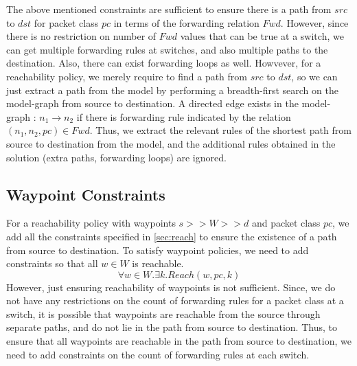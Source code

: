 The above mentioned constraints are sufficient to ensure there is a path from $src$ to $dst$ for packet class $pc$ in terms of the forwarding relation $Fwd$. However, since there is no restriction on number of $Fwd$ values that can be true at a switch, we can get multiple forwarding rules at switches, and also multiple paths to the destination. Also, there can exist forwarding loops as well. Howvever, for a reachability policy, we merely require to find a path from $src$ to $dst$, so we can just extract a path from the model by performing a breadth-first search on the model-graph from source to destination. A directed edge exists in the model-graph : $n_1 \rightarrow n_2$ if there is forwarding rule indicated by the relation $(n_1,n_2, pc) \in Fwd$. Thus, we extract the relevant rules of the shortest path from source to destination from the model, and the additional rules obtained in the solution (extra paths, forwarding loops) are ignored.  
\subsection{Waypoint Constraints} 
For a reachability policy with waypoints $s >> W >> d$ and packet class $pc$, we add all the constraints specified in \cref{sec:reach} to ensure the existence of a path from source to destination. To satisfy waypoint policies, we need to add constraints so that all $w \in W$ is reachable. 
\begin{equation} \label{eq:waypoints}
	\forall w \in W. \exists k. Reach(w, pc, k)
\end{equation}
However, just ensuring reachability of waypoints is not sufficient. Since, we do not have any restrictions on the count of forwarding rules for a packet class at a switch, it is possible that waypoints are reachable from the source through separate paths, and do not lie in the path from source to destination. Thus, to ensure that all waypoints are reachable in the path from source to destination, we need to add constraints on the count of forwarding rules at each switch. 

